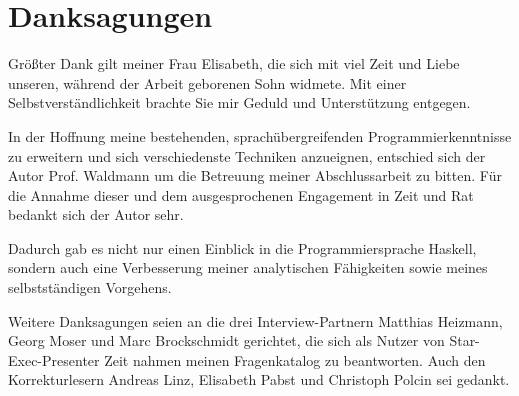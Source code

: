 \chapter*{Danksagungen}

Größter Dank gilt meiner Frau Elisabeth, die sich mit viel Zeit und Liebe unseren, während der Arbeit geborenen Sohn widmete. Mit einer Selbstverständlichkeit brachte Sie mir Geduld und Unterstützung entgegen.

In der Hoffnung meine bestehenden, sprachübergreifenden Programmierkenntnisse zu erweitern und sich verschiedenste Techniken anzueignen, entschied sich der Autor Prof. Waldmann um die Betreuung meiner Abschlussarbeit zu bitten.
Für die Annahme dieser und dem ausgesprochenen Engagement in Zeit und Rat bedankt sich der Autor sehr.

Dadurch gab es nicht nur einen Einblick in die Programmiersprache Haskell, sondern auch eine Verbesserung meiner analytischen Fähigkeiten sowie meines selbstständigen Vorgehens.

Weitere Danksagungen seien an die drei Interview-Partnern Matthias Heizmann, Georg Moser und Marc Brockschmidt gerichtet, die sich als Nutzer von Star-Exec-Presenter Zeit nahmen meinen Fragenkatalog zu beantworten. Auch den Korrekturlesern Andreas Linz, Elisabeth Pabst und Christoph Polcin sei gedankt.
